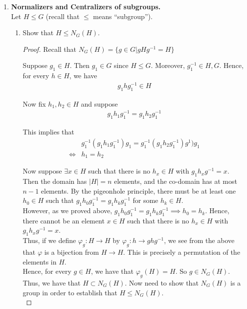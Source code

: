 \documentclass[11pt, reqno]{amsart}
\theoremstyle{plain}
\theoremstyle{definition}
\theoremstyle{example}
\begin{document}
\begin{enumerate}[1.]
\item {\bf Normalizers and Centralizers of subgroups.}\\
Let $H \leq G$ (recall that $\leq$ means ``subgroup''). 
\begin{enumerate}
\item Show that $H \leq N_G(H)$. 
\begin{proof}
Recall that $N_G(H) = \{g \in G | gHg^{-1} = H\}$

Suppose $g_1 \in H$. Then $g_1 \in G$ since $H \leqslant G$. Moreover, $g_1^{-1} \in H, G$. Hence, for every $h \in H$, we have
\begin{align*}
g_1hg_1^{-1} \in H
\end{align*}

Now fix $h_1, h_2 \in H$ and suppose
\begin{align*}
g_1h_1g_1^{-1} = g_1h_2g_1^{-1}
\end{align*}

This implies that
\begin{align*}
&g_1^{-1}(g_1h_1g_1^{-1})g_1 = g_1^{-1}(g_1h_2g_1^{-1})g^1)g_1\\
\iff &h_1 = h_2
\end{align*}

Now suppose $\exists x \in H$ such that there is no $h_x \in H$ with $g_1h_xg^{-1} = x$.\\

Then the domain has $|H| = n$ elements, and the co-domain has at most $n-1$ elements. By the pigeonhole principle, there must be at least one $h_0 \in H$ such that $g_1h_0g_1^{-1} = g_1h_kg_1^{-1}$ for some $h_k \in H$.\\

However, as we proved above, $g_1h_0g_1^{-1} = g_1h_kg_1^{-1} \implies h_0 = h_k$. Hence, there cannot be an element $x \in H$ such that there is no $h_x \in H$ with $g_1h_xg^{-1} = x$.\\

Thus, if we define $\varphi_g: H \to H$ by $\varphi_g: h \to ghg^{-1}$, we see from the above that $\varphi$ is a bijection from $H \to H$. This is precisely a permutation of the elements in $H$.\\

Hence, for every $g \in H$, we have that $\varphi_g(H) = H$. So $g \in N_G(H)$.\\

Thus, we have that $H \subset N_G(H)$. Now need to show that $N_G(H)$ is a group in order to establish that $H \leqslant N_G(H)$.\\


\end{proof}
\end{enumerate}
\end{enumerate}
\end{document}
